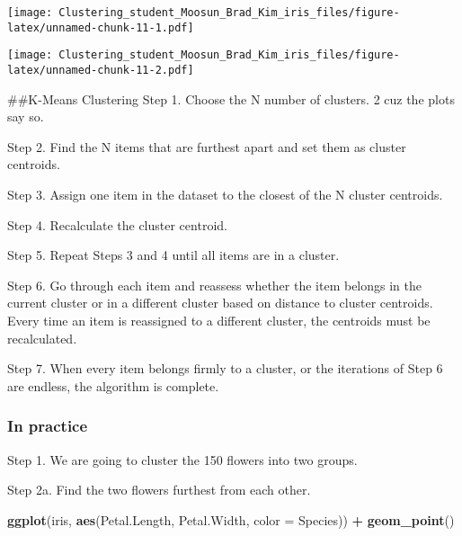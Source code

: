 \documentclass[11pt,]{article}
\newenvironment{Shaded}{\begin{snugshade}}{\end{snugshade}}
\newcommand{\DataTypeTok}[1]{\textcolor[rgb]{0.13,0.29,0.53}{#1}}
\newcommand{\DecValTok}[1]{\textcolor[rgb]{0.00,0.00,0.81}{#1}}
\newcommand{\KeywordTok}[1]{\textcolor[rgb]{0.13,0.29,0.53}{\textbf{#1}}}
\newcommand{\NormalTok}[1]{#1}
\newcommand{\OperatorTok}[1]{\textcolor[rgb]{0.81,0.36,0.00}{\textbf{#1}}}
\newcommand{\OtherTok}[1]{\textcolor[rgb]{0.56,0.35,0.01}{#1}}
\newcommand{\StringTok}[1]{\textcolor[rgb]{0.31,0.60,0.02}{#1}}
\begin{document}
\texttt{[image: Clustering\_student\_Moosun\_Brad\_Kim\_iris\_files/figure-latex/unnamed-chunk-11-1.pdf]}

\begin{Shaded}
\end{Shaded}

\texttt{[image: Clustering\_student\_Moosun\_Brad\_Kim\_iris\_files/figure-latex/unnamed-chunk-11-2.pdf]}

\newpage

\#\#K-Means Clustering Step 1. Choose the N number of clusters. 2 cuz
the plots say so.

Step 2. Find the N items that are furthest apart and set them as cluster
centroids.

Step 3. Assign one item in the dataset to the closest of the N cluster
centroids.

Step 4. Recalculate the cluster centroid.

Step 5. Repeat Steps 3 and 4 until all items are in a cluster.

Step 6. Go through each item and reassess whether the item belongs in
the current cluster or in a different cluster based on distance to
cluster centroids. Every time an item is reassigned to a different
cluster, the centroids must be recalculated.

Step 7. When every item belongs firmly to a cluster, or the iterations
of Step 6 are endless, the algorithm is complete.

\hypertarget{in-practice-1}{%
\subsubsection{In practice}\label{in-practice-1}}

Step 1. We are going to cluster the 150 flowers into two groups.

Step 2a. Find the two flowers furthest from each other.

\begin{Shaded}
\begin{Highlighting}[]
\KeywordTok{ggplot}\NormalTok{(iris, }\KeywordTok{aes}\NormalTok{(Petal.Length, Petal.Width, }\DataTypeTok{color =}\NormalTok{ Species)) }\OperatorTok{+}\StringTok{ }\KeywordTok{geom_point}\NormalTok{()}
\end{Highlighting}
\end{Shaded}
\end{document}
